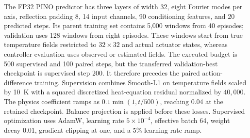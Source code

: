 The FP32 PINO predictor has three layers of width 32, eight Fourier modes per axis, reflection padding 8, 14 input channels, 90 conditioning features, and 20 predicted steps. Its parent training set contains 5,000 windows from 40 episodes; validation uses 128 windows from eight episodes. These windows start from true temperature fields restricted to $32\times32$ and actual actuator states, whereas controller evaluation uses observed or estimated fields. The executed budget is 500 supervised and 100 paired steps, but the transferred validation-best checkpoint is supervised step 200. It therefore precedes the paired action-difference training. Supervision combines Smooth-L1 on temperature fields scaled by 10~K with a squared discretized heat-equation residual normalized by $40{,}000$. The physics coefficient ramps as $0.1\min(1,t/500)$, reaching 0.04 at the retained checkpoint. Balance projection is applied before these losses. Supervised optimization uses AdamW, learning rate $5\times10^{-4}$, effective batch 64, weight decay 0.01, gradient clipping at one, and a 5\% learning-rate ramp.

